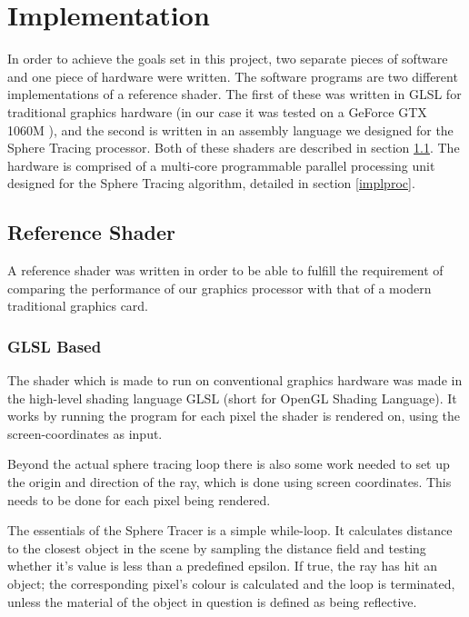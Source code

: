 \chapter{Implementation}
	
	In order to achieve the goals set in this project, two separate pieces of 
	software and one piece of hardware were written. The software programs are 
	two different implementations of a reference shader. The first of these was 
	written in GLSL for traditional graphics hardware (in our case it was 
	tested on a GeForce GTX 1060M ), and the second is written in an assembly 
	language we designed for the Sphere Tracing processor. Both of these 
	shaders are described in section \ref{implshader}. The hardware is 
	comprised of a multi-core programmable parallel processing unit designed 
	for the Sphere Tracing algorithm, detailed in section \ref{implproc}.

	\section{Reference Shader} \label{implshader}

		A reference shader was written in order to be able to fulfill the
		requirement of comparing the performance of our graphics processor with
		that of a modern traditional graphics card.
	
		\subsection{GLSL Based}
	
			The shader which is made to run on conventional graphics hardware
			was made in the high-level shading language GLSL (short for OpenGL
			Shading Language). It works by running the program for each pixel
			the shader is rendered on, using the screen-coordinates as input.
			
			Beyond the actual sphere tracing loop there is also some work
			needed to set up the origin and direction of the ray, which is done
			using screen coordinates. This needs to be done for each pixel
			being rendered.
			
			The essentials of the Sphere Tracer is a simple while-loop. It
			calculates distance to the closest object in the scene by sampling
			the distance field and testing whether it's value is less than a
			predefined epsilon. If true, the ray has hit an object; the
			corresponding pixel's colour is calculated and the loop is
			terminated, unless the material of the object in question is
			defined as being reflective.
		
